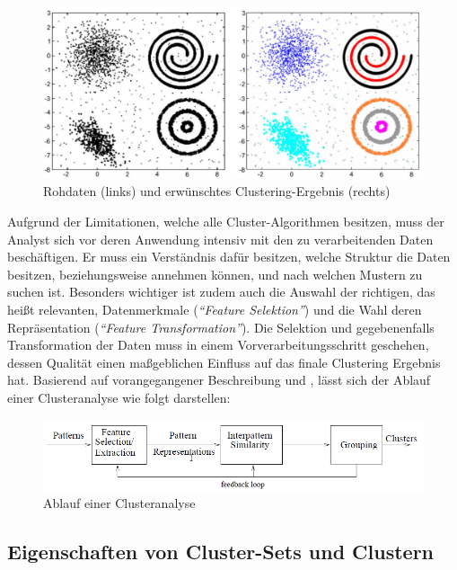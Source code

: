\begin{figure}[H]
    \centering
    \includegraphics[width=0.8\linewidth]{../resources/img/grundlagen/clustering_example}
    \caption[Rohdaten (links) und erwünschtes Clustering-Ergebnis (rechts)]{Rohdaten (links) und erwünschtes Clustering-Ergebnis (rechts) \cite[]{Jain2010}}
    \label{fig:grund_clustering_example}
\end{figure}

Aufgrund der Limitationen, welche alle Cluster-Algorithmen besitzen, muss der Analyst sich vor deren Anwendung intensiv
mit den zu verarbeitenden Daten beschäftigen. Er muss ein Verständnis dafür besitzen, welche Struktur die Daten
besitzen, beziehungsweise annehmen können, und nach welchen Mustern zu suchen ist.
Besonders wichtiger ist zudem auch die Auswahl der richtigen, das heißt relevanten, Datenmerkmale (\textit{``Feature Selektion''})
und die Wahl deren Repräsentation (\textit{``Feature Transformation''}).
Die Selektion und gegebenenfalls Transformation der Daten muss in einem
Vorverarbeitungsschritt geschehen, dessen Qualität einen maßgeblichen Einfluss auf das finale Clustering Ergebnis hat.
Basierend auf vorangegangener Beschreibung und \cite[]{Jain1999}, lässt sich der Ablauf einer Clusteranalyse wie folgt darstellen:

\begin{figure}[H]
    \centering
    \includegraphics[width=0.8\linewidth]{../resources/img/grundlagen/clustering_workflow}
    \caption{Ablauf einer Clusteranalyse}
    \label{fig:grund_clustering_workflow}
\end{figure}

\subsection{Eigenschaften von Cluster-Sets und Clustern}

